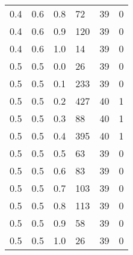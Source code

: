 \begin{table}[!htb]
\begin{minipage}{.45\linewidth}
\begin{tabular}{||p{}p{}p{}p{}p{}p{}||}
			0.4 & 0.6 & 0.8 & 72 & 39 & 0 \\ 
			0.4 & 0.6 & 0.9 & 120 & 39 & 0 \\ 
			0.4 & 0.6 & 1.0 & 14 & 39 & 0  \\ \hline
			0.5 & 0.5 & 0.0 & 26 & 39 & 0 \\ 
			0.5 & 0.5 & 0.1 & 233 & 39 & 0 \\ 
			0.5 & 0.5 & 0.2 & 427 & 40 & 1 \\ 
			0.5 & 0.5 & 0.3 & 88 & 40 & 1 \\ 
			0.5 & 0.5 & 0.4 & 395 & 40 & 1 \\ 
			0.5 & 0.5 & 0.5 & 63 & 39 & 0 \\ 
			0.5 & 0.5 & 0.6 & 83 & 39 & 0 \\ 
			0.5 & 0.5 & 0.7 & 103 & 39 & 0 \\ 
			0.5 & 0.5 & 0.8 & 113 & 39 & 0 \\ 
			0.5 & 0.5 & 0.9 & 58 & 39 & 0 \\ 
			0.5 & 0.5 & 1.0 & 26 & 39 & 0  \\ \hline
			
		\end{tabular}
	\end{minipage} 
\end{table} 

